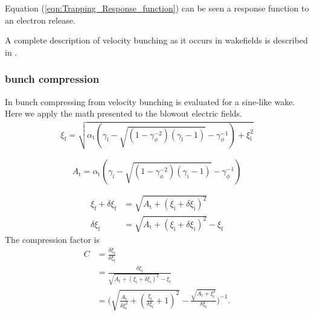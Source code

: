 Equation (\ref{eqn:Trapping_Response_function}) can be seen a response function to an electron release. 



A complete description of velocity bunching as it occurs in wakefields is described in
\cite{AndersonVelocBunchPPRSTAB2005,serafini2001velocity}.

\subsubsection*{bunch compression}
In \cite{AndersonVelocBunchPPRSTAB2005,serafini2001velocity} bunch compressing from velocity bunching is evaluated for a sine-like wake. Here we apply the math presented to the blowout electric fields. 
\begin{align}
\xi_\mathrm{f}=\sqrt{\alpha_\mathrm{t}(\gamma_\mathrm{i}-\sqrt{(1-\gamma_\phi^{-2})(\gamma_\mathrm{i}-1) }-\gamma_\phi^{-1})+\xi_\mathrm{i}^2}
\end{align}

\begin{equation}
A_\mathrm{t}=\alpha_\mathrm{t}(\gamma_\mathrm{i}-\sqrt{(1-\gamma_\phi^{-2})(\gamma_\mathrm{i}-1) }-\gamma_\phi^{-1})
\end{equation}

\begin{align}
\xi_\mathrm{f}+\delta \xi_\mathrm{f}&=\sqrt{A_\mathrm{t}+(\xi_\mathrm{i}+\delta\xi_\mathrm{i})^2}\\
\delta \xi_\mathrm{f}&=\sqrt{A_\mathrm{t}+(\xi_\mathrm{i}+\delta\xi_\mathrm{i})^2}-\xi_\mathrm{f}
\end{align}
The compression factor is 
\begin{align}
C&=\frac{\delta \xi_\mathrm{i}}{\delta \xi_\mathrm{f}}\\
&= \frac{\delta \xi_\mathrm{i}}{\sqrt{A_\mathrm{t}+(\xi_\mathrm{i}+\delta\xi_\mathrm{i})^2}-\xi_\mathrm{f}}\\
&=\Bigg(\sqrt{\frac{A_\mathrm{t}}{\delta \xi_\mathrm{i}^2}+(\frac{\xi_\mathrm{i}}{\delta \xi_\mathrm{i}}+1)^2 } -\frac{\sqrt{A_\mathrm{t}+\xi_\mathrm{i}^2}}{\delta\xi_\mathrm{i}}\Bigg)^{-1}.
\end{align}
